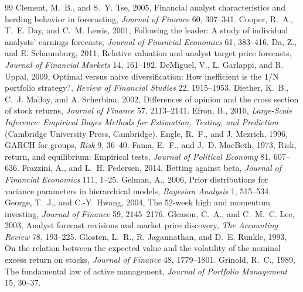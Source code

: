 \begin{thebibliography}{99}
 Clement, M.~B., and S.~Y. Tse, 2005, Financial analyst characteristics and herding behavior in forecasting, \emph{Journal of Finance} 60, 307--341.
 Cooper, R.~A., T.~E. Day, and C.~M. Lewis, 2001, Following the leader: A study of individual analysts' earnings forecasts, \emph{Journal of Financial Economics} 61, 383--416.
 Da, Z., and E. Schaumburg, 2011, Relative valuation and analyst target price forecasts, \emph{Journal of Financial Markets} 14, 161--192.
 DeMiguel, V., L. Garlappi, and R. Uppal, 2009, Optimal versus naive diversification: How inefficient is the 1/N portfolio strategy?, \emph{Review of Financial Studies} 22, 1915--1953.
 Diether, K.~B., C.~J. Malloy, and A. Scherbina, 2002, Differences of opinion and the cross section of stock returns, \emph{Journal of Finance} 57, 2113--2141.
 Efron, B., 2010, \emph{Large-Scale Inference: Empirical Bayes Methods for Estimation, Testing, and Prediction} (Cambridge University Press, Cambridge).
 Engle, R.~F., and J. Mezrich, 1996, GARCH for groups, \emph{Risk} 9, 36--40.
 Fama, E.~F., and J.~D. MacBeth, 1973, Risk, return, and equilibrium: Empirical tests, \emph{Journal of Political Economy} 81, 607--636.
 Frazzini, A., and L.~H. Pedersen, 2014, Betting against beta, \emph{Journal of Financial Economics} 111, 1--25.
 Gelman, A., 2006, Prior distributions for variance parameters in hierarchical models, \emph{Bayesian Analysis} 1, 515--534.
 George, T.~J., and C.-Y. Hwang, 2004, The 52-week high and momentum investing, \emph{Journal of Finance} 59, 2145--2176.
 Gleason, C.~A., and C.~M.~C. Lee, 2003, Analyst forecast revisions and market price discovery, \emph{The Accounting Review} 78, 193--225.
 Glosten, L.~R., R. Jagannathan, and D.~E. Runkle, 1993, On the relation between the expected value and the volatility of the nominal excess return on stocks, \emph{Journal of Finance} 48, 1779--1801.
 Grinold, R.~C., 1989, The fundamental law of active management, \emph{Journal of Portfolio Management} 15, 30--37.

\end{thebibliography}
